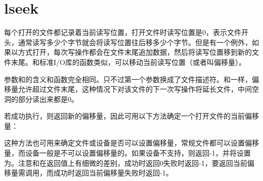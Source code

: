 




\section{lseek}
%
每个打开的文件都记录着当前读写位置，打开文件时读写位置是0，表示文件开头，通常读写多少个字节就会将读写位置往后移多少个字节。但是有一个例外，如果以方式打开，每次写操作都会在文件末尾追加数据，然后将读写位置移到新的文件末尾。和标准I/\BookSplit{}O库的函数类似，可以移动当前读写位置（或者叫偏移量）。




参数和的含义和函数完全相同。只不过第一个参数换成了文件描述符。和一样，偏移量允许超过文件末尾，这种情况下对该文件的下一次写操作将延长文件，中间空洞的部分读出来都是0。



若成功执行，则返回新的偏移量，因此可用以下方法确定一个打开文件的当前偏移量：




这种方法也可用来确定文件或设备是否可以设置偏移量，常规文件都可以设置偏移量，而设备一般是不可以设置偏移量的。如果设备不支持，则返回-1，并将设置为。注意和在返回值上有细微的差别，成功时返回0失败时返回-1，要返回当前偏移量需调用，而成功时返回当前偏移量失败时返回-1。





